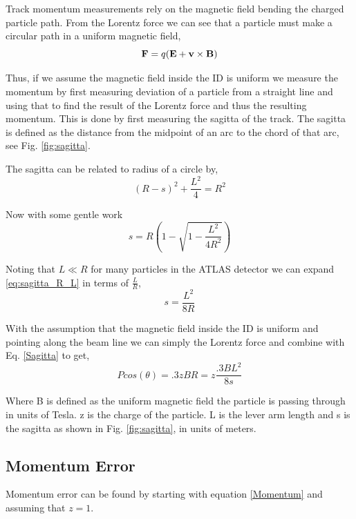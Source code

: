 Track momentum measurements rely on the magnetic field bending the charged particle path. From the Lorentz force we can see that a particle must make a circular path in a uniform magnetic field, 
\[
\bold{F} = q (\bold{E} + \bold{v} \times \bold{B})
\]


Thus, if we assume the magnetic field inside the ID is uniform we measure the momentum by first measuring deviation of a particle from a straight line and using that to find the result of the Lorentz force and thus the resulting momentum. 
This is done by first measuring the sagitta of the track.
The sagitta is defined as the distance from the midpoint of an arc to the chord of that arc, see Fig. \ref{fig:sagitta}. 


	
	The sagitta can be related to radius of a circle by, 
	\begin{equation}
		(R - s)^2 + \frac{L^2}{4} = R^2
	\end{equation}
	
	Now with some gentle work 
	\begin{equation}
		s = R\left(1 - \sqrt{1 - \frac{L^2}{4R^2}}\right) 
		\label{eq:sagitta_R_L}
	\end{equation}
	
	Noting that $L \ll R$ for many particles in the ATLAS detector we can expand \ref{eq:sagitta_R_L} in terms of $\frac{L}{R}$,
	\begin{equation}
		s = \frac{L^2}{8R} \label{Sagitta}
	\end{equation}
	
	With the assumption that the magnetic field inside the ID is uniform and pointing along the beam line we can simply the Lorentz force and combine with Eq. \ref{Sagitta} to get,
	\begin{equation}
		P cos (\theta) = .3 z B R = z \frac{.3 B L^2}{8 s} \label{Momentum}
	\end{equation}
	
	Where B is defined as the uniform magnetic field the particle is passing through in units of Tesla. z is the charge of the particle. L is the lever arm length and s is the sagitta as shown in Fig. \ref{fig:sagitta}, in units of meters.
	\subsection{Momentum Error}
	\label{sec:P-error}
	Momentum error can be found by starting with equation \ref{Momentum} and assuming that $z=1$. 
	
